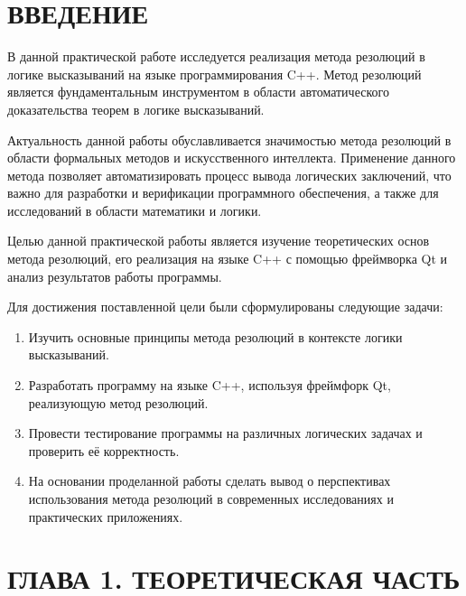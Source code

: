 \documentclass[12pt, a4paper]{article}
\date{}
\begin{document}
	\begin{center}
		\renewcommand{\contentsname}{\MakeUppercase{Содержание}}
		\tableofcontents{}
		
	\end{center}
	\setcounter{page}{2}
	\newpage
	\setcounter{subsection}{0}
	\setcounter{equation}{0}
	\setcounter{section}{0}
	
	\section*{\centering ВВЕДЕНИЕ}
	
	\par В данной практической работе исследуется реализация метода резолюций в логике высказываний на языке программирования C++. Метод резолюций является фундаментальным инструментом в области автоматического доказательства теорем в логике высказываний.
	\par Актуальность данной работы обуславливается значимостью метода резолюций в области формальных методов и искусственного интеллекта. Применение данного метода позволяет автоматизировать процесс вывода логических заключений, что важно для разработки и верификации программного обеспечения, а также для исследований в области математики и логики.
	\par Целью данной практической работы является изучение теоретических основ метода резолюций, его реализация на языке C++ с помощью фреймворка Qt и анализ результатов работы программы.
	\par Для достижения поставленной цели были сформулированы следующие задачи:
	\begin{enumerate}
		\item Изучить основные принципы метода резолюций в контексте логики высказываний.
		\item Разработать программу на языке C++, используя фреймфорк Qt, реализующую метод резолюций.
		\item Провести тестирование программы на различных логических задачах и проверить её корректность.
		\item На основании проделанной работы сделать вывод о перспективах использования метода резолюций в современных исследованиях и практических приложениях.
	\end{enumerate}
	
	
	\newpage
	
	
	\addtocounter{section}{+1}
	\section*{\centering ГЛАВА 1. ТЕОРЕТИЧЕСКАЯ ЧАСТЬ}
	
\end{document}
